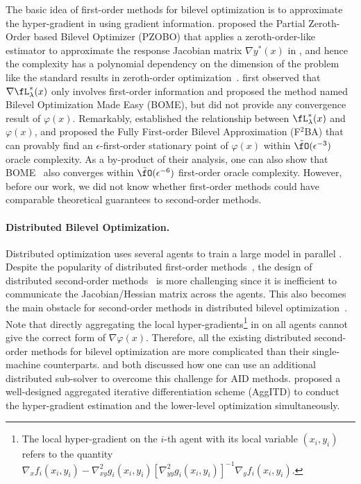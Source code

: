 \documentclass{article}
\begin{document}
The basic idea of first-order methods for bilevel optimization is to approximate the hyper-gradient in  using gradient information. \citet{sow2022convergence} proposed the 
Partial Zeroth-Order based Bilevel Optimizer (PZOBO) that
applies a zeroth-order-like estimator to approximate the response Jacobian matrix $\nabla y^*(x) $ in , and hence 
the complexity has a polynomial 
dependency on the dimension of the problem like the standard results in zeroth-order optimization~\citep{duchi2015optimal,ghadimi2013stochastic,kornowski2023algorithm}.
\citet{liu2022bome} first observed  that $\nabla \fL_{\lambda}^*(x)$ only involves first-order information and proposed the method named Bilevel Optimization Made Easy (BOME), 
but \citet{liu2022bome} did not provide any convergence result of $\varphi(x)$. Remarkably, \citet{kwon2023fully}
established
the relationship between $\fL_{\lambda}^*(x)$  and $\varphi(x)$, and proposed the Fully First-order Bilevel Approximation (F${}^2$BA) that can provably find an $\epsilon$-first-order stationary point of $\varphi(x)$ within $\tilde \fO(\epsilon^{-3})$ oracle complexity. As a by-product of their analysis, one can also show that BOME~\citep{liu2022bome} also converges within $\tilde \fO(\epsilon^{-6})$ first-order oracle complexity. 
However, before our work, we did not know whether first-order methods could have comparable theoretical guarantees to second-order methods.

\paragraph{Distributed Bilevel Optimization.}

Distributed optimization uses 
several agents to
train a large model in parallel \citep{boyd2011convex}. 
Despite the popularity of distributed first-order methods~\citep{liconvergence,recht2011hogwild,lin2019don}, the design of distributed second-order methods~\citep{wang2018giant,shamir2014communication,liu2023communication} is more challenging since it is inefficient to communicate the Jacobian/Hessian matrix across the agents.
This also becomes the main obstacle for second-order methods in distributed bilevel optimization~\citep{yangdecentralized,huang2023achieving,tarzanagh2022fednest,lu2022decentralized}. 
Note that directly aggregating the local hyper-gradients\footnote{The local hyper-gradient on the $i$-th agent with its local variable $(x_i,y_i)$ refers to the quantity $\nabla_x f_i(x_i,y_i)  - \nabla_{xy}^2 g_i(x_i,y_i) [\nabla_{yy}^2 g_i(x_i,y_i)]^{-1} \nabla_y f_i(x_i,y_i)$.} in  on all agents cannot give the correct form of $\nabla \varphi(x)$. 
Therefore,  
all the existing distributed second-order methods for bilevel optimization are more complicated than their single-machine counterparts. \citet{tarzanagh2022fednest} and \citet{chen2022decentralized} both
discussed how one can use an additional distributed 
sub-solver to overcome this challenge 
for AID methods.
\citet{xiao2023communication} proposed a well-designed aggregated iterative differentiation scheme (AggITD) to conduct the hyper-gradient
estimation and the lower-level optimization simultaneously. 
\end{document}

